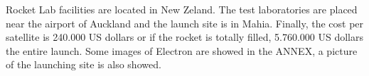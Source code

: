 Rocket Lab facilities are located in New Zeland. The test laboratories are placed near the airport of Auckland and the launch site is in Mahia.
Finally, the cost per satellite is 240.000 US dollars or if the rocket is totally filled, 5.760.000 US dollars the entire launch. Some images of Electron are showed in the ANNEX, a picture of the launching site is also showed. 


